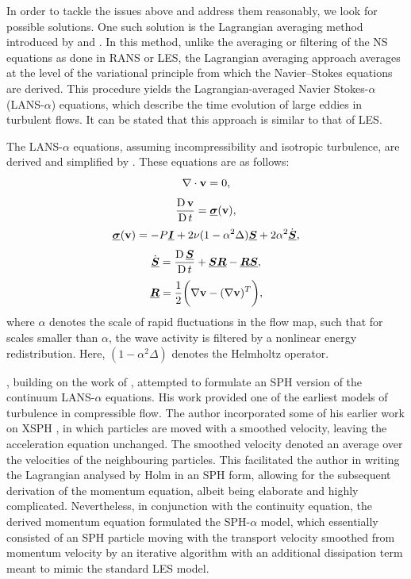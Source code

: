 In order to tackle the issues above and address them reasonably, we look for possible solutions. One such solution is the Lagrangian averaging method introduced by \cite{holm1998euler} and \cite{Marsden2001}. In this method, unlike the averaging or filtering of the NS equations as done in RANS or LES, the Lagrangian averaging approach averages at the level of the variational principle from which the Navier–Stokes equations are derived. This procedure yields the Lagrangian-averaged Navier Stokes-$\alpha$ (LANS-$\alpha$) equations, which describe the time evolution of large eddies in turbulent flows. It can be stated that this approach is similar to that of LES.

The LANS-$\alpha$ equations, assuming incompressibility and isotropic turbulence, are derived and simplified by \cite{Mohseni2003}. These equations are as follows:
\begin{equation}
    \nabla \cdot \mathbf{v} = 0,
\end{equation}
\begin{equation}
    \frac{\operatorname{D} \mathbf{v}}{\operatorname{D} t} = \underline{\bm{\sigma}}(\mathbf{v}),
\end{equation}
\begin{equation}
    \underline{\bm{\sigma}}(\mathbf{v}) = -P\underline{\bm{I}} + 2\nu(1 - \alpha^2\Delta)\underline{\bm{S}} + 2\alpha^2\Dot{\underline{\bm{S}}},
    \label{eq:LANS-alpha-stress-tensor}
\end{equation}
\begin{equation}
    \Dot{\underline{\bm{S}}} = \frac{\operatorname{D} \underline{\bm{S}}}{\operatorname{D} t} + \underline{\bm{S}}\underline{\bm{R}} - \underline{\bm{R}}\underline{\bm{S}},
\end{equation}
\begin{equation}
    \underline{\bm{R}} = \frac{1}{2}\bigg(\nabla\mathbf{v}-(\nabla\mathbf{v})^T\bigg),
\end{equation}
where $\alpha$ denotes the scale of rapid fluctuations in the flow map, such that for scales smaller than $\alpha$, the wave activity is filtered by a nonlinear energy redistribution. Here, $(1 - \alpha^2 \Delta)$ denotes the Helmholtz operator.

\cite{Monaghan2002}, building on the work of \cite{holm1998euler}, attempted to formulate an SPH version of the continuum LANS-$\alpha$ equations. His work provided one of the earliest models of turbulence in compressible flow. The author incorporated some of his earlier work on XSPH \parencite{monaghan1989problem}, in which particles are moved with a smoothed velocity, leaving the acceleration equation unchanged. The smoothed velocity denoted an average over the velocities of the neighbouring particles. This facilitated the author in writing the Lagrangian analysed by Holm in an SPH form, allowing for the subsequent derivation of the momentum equation, albeit being elaborate and highly complicated. Nevertheless, in conjunction with the continuity equation, the derived momentum equation formulated the SPH-$\alpha$ model, which essentially consisted of an SPH particle moving with the transport velocity smoothed from momentum velocity by an iterative algorithm with an additional dissipation term meant to mimic the standard LES model.


